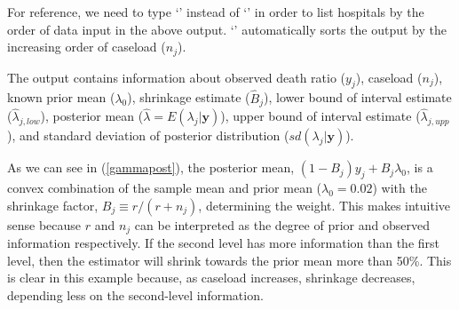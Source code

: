 \documentclass[article]{jss}
\begin{document}
For reference, we need to type `' instead of `' in order to list hospitals by the order of data input in the above output. `' automatically sorts the output by the increasing order of caseload ($n_{j}$). 


The output contains information about observed death ratio ($y_{j}$), caseload ($n_{j}$), known prior mean ($\lambda_{0}$), shrinkage estimate ($\hat{B}_{j}$), lower bound of interval estimate ($\hat{\lambda}_{j, low}$), posterior mean ($\hat{\lambda}=E(\lambda_{j}\vert \textbf{y})$), upper bound of interval estimate ($\hat{\lambda}_{j, upp}$), and standard deviation of posterior distribution ($sd(\lambda_{j}\vert \textbf{y})$).


As we can see in (\ref{gammapost}), the posterior mean, $(1-B_{j})y_{j} + B_{j}\lambda_{0}$, is a convex combination of the sample mean and prior mean ($\lambda_{0}=0.02$) with the shrinkage factor, $B_{j}\equiv r / (r + n_{j})$, determining the weight. This makes intuitive sense because $r$ and $n_{j}$ can be interpreted as the degree of prior and observed information respectively. If the second level has more information than the first level, then the estimator will shrink towards the prior mean more than 50\%. This is clear in this example because, as caseload increases, shrinkage decreases, depending less on the second-level information.
\end{document}
